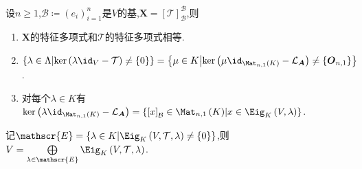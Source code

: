 \begin{remark}{}{}
	设$n\geq 1$,$\mathcal{B}\coloneq\left(e_{i}\right)_{i=1}^{n}$是$V$的基,$\boldsymbol{X}=\left[\mathcal{T}\right]_{\mathcal{B}}^{\mathcal{B}}$,则
	\begin{enumerate}
		\item $\boldsymbol{X}$的特征多项式和$\mathcal{T}$的特征多项式相等.
		\item $\left\{\lambda\in\Lambda\middle|\ker\left(\lambda\id_{V}-\mathcal{T}\right)\neq\left\{0\right\}\right\}=\left\{\mu\in K\middle|\ker\left(\mu\id_{\Mat_{n,1}\left(K\right)}-\mathcal{L}_{\boldsymbol{A}}\right)\neq\left\{\boldsymbol{O}_{n,1}\right\}\right\}$.
		\item 对每个$\lambda\in K$有$\ker\left(\lambda\id_{\Mat_{n,1}\left(K\right)}-\mathcal{L}_{\boldsymbol{A}}\right)=\left\{\left[x\right]_{\mathcal{B}}\in\Mat_{n,1}\left(K\right)\middle|x\in\Eig_{K}\left(V,\lambda\right)\right\}$.
	\end{enumerate}
\end{remark}

\begin{proposition}{}{}
	记$\mathscr{E}=\left\{\lambda\in K\middle|\Eig_{K}\left(V,\mathcal{T},\lambda\right)\neq\left\{0\right\}\right\}$,则$V=\bigoplus\limits_{\lambda\in\mathscr{E}}\Eig_{K}\left(V,\mathcal{T},\lambda\right)$.
\end{proposition}
































